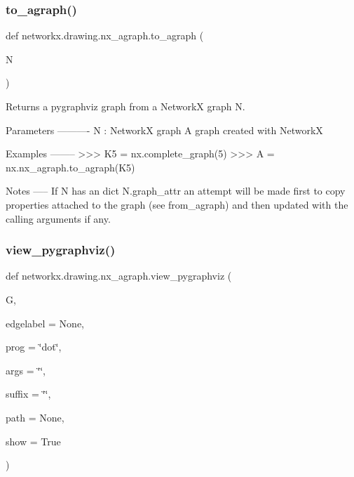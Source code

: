 \subsubsection{\texorpdfstring{to\+\_\+agraph()}{to\_agraph()}}
{\footnotesize\ttfamily def networkx.\+drawing.\+nx\+\_\+agraph.\+to\+\_\+agraph (\begin{DoxyParamCaption}\item[{}]{N }\end{DoxyParamCaption})}

\begin{DoxyVerb}Returns a pygraphviz graph from a NetworkX graph N.

Parameters
----------
N : NetworkX graph
  A graph created with NetworkX

Examples
--------
>>> K5 = nx.complete_graph(5)
>>> A = nx.nx_agraph.to_agraph(K5)

Notes
-----
If N has an dict N.graph_attr an attempt will be made first
to copy properties attached to the graph (see from_agraph)
and then updated with the calling arguments if any.\end{DoxyVerb}
 \mbox{\label{namespacenetworkx_1_1drawing_1_1nx__agraph_a9e527c9027186eeef0d34b2768288904}} 
\subsubsection{\texorpdfstring{view\+\_\+pygraphviz()}{view\_pygraphviz()}}
{\footnotesize\ttfamily def networkx.\+drawing.\+nx\+\_\+agraph.\+view\+\_\+pygraphviz (\begin{DoxyParamCaption}\item[{}]{G,  }\item[{}]{edgelabel = {\ttfamily None},  }\item[{}]{prog = {\ttfamily \char`\"{}dot\char`\"{}},  }\item[{}]{args = {\ttfamily \char`\"{}\char`\"{}},  }\item[{}]{suffix = {\ttfamily \char`\"{}\char`\"{}},  }\item[{}]{path = {\ttfamily None},  }\item[{}]{show = {\ttfamily True} }\end{DoxyParamCaption})}


